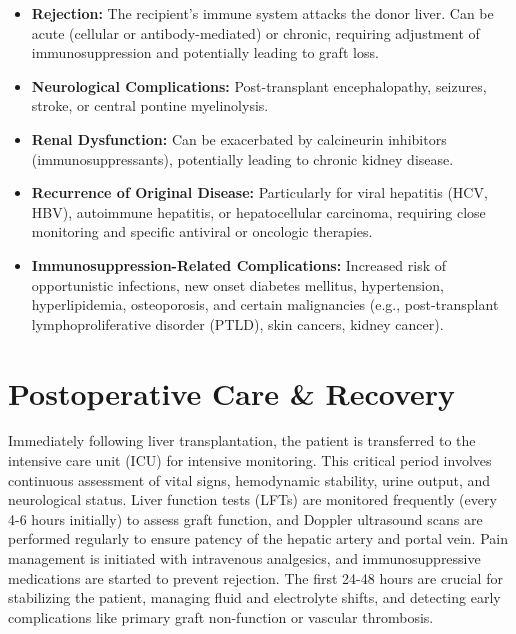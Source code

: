 \begin{itemize}
\begin{itemize}
\begin{itemize}
          \item \textit{Biliary Stricture:} Narrowing of the bile duct anastomosis or intrahepatic ducts, causing cholestasis, cholangitis, and potentially graft dysfunction, often requiring endoscopic or percutaneous intervention.
        \end{itemize}
      \item \textbf{Rejection:} The recipient's immune system attacks the donor liver. Can be acute (cellular or antibody-mediated) or chronic, requiring adjustment of immunosuppression and potentially leading to graft loss.
      \item \textbf{Neurological Complications:} Post-transplant encephalopathy, seizures, stroke, or central pontine myelinolysis.
      \item \textbf{Renal Dysfunction:} Can be exacerbated by calcineurin inhibitors (immunosuppressants), potentially leading to chronic kidney disease.
      \item \textbf{Recurrence of Original Disease:} Particularly for viral hepatitis (HCV, HBV), autoimmune hepatitis, or hepatocellular carcinoma, requiring close monitoring and specific antiviral or oncologic therapies.
      \item \textbf{Immunosuppression-Related Complications:} Increased risk of opportunistic infections, new onset diabetes mellitus, hypertension, hyperlipidemia, osteoporosis, and certain malignancies (e.g., post-transplant lymphoproliferative disorder (PTLD), skin cancers, kidney cancer).
    \end{itemize}
\end{itemize}

\section*{Postoperative Care \& Recovery}
Immediately following liver transplantation, the patient is transferred to the intensive care unit (ICU) for intensive monitoring. This critical period involves continuous assessment of vital signs, hemodynamic stability, urine output, and neurological status. Liver function tests (LFTs) are monitored frequently (every 4-6 hours initially) to assess graft function, and Doppler ultrasound scans are performed regularly to ensure patency of the hepatic artery and portal vein. Pain management is initiated with intravenous analgesics, and immunosuppressive medications are started to prevent rejection. The first 24-48 hours are crucial for stabilizing the patient, managing fluid and electrolyte shifts, and detecting early complications like primary graft non-function or vascular thrombosis.

